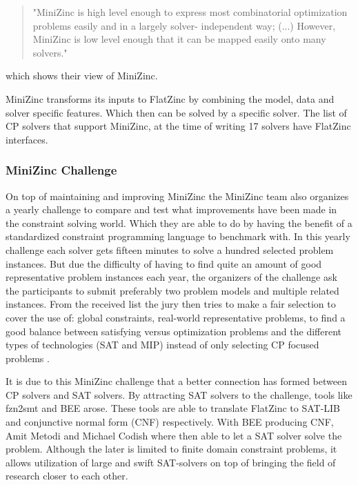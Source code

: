 \begin{quote}
	"MiniZinc is high level enough to express most combinatorial optimization problems easily and in a largely solver-
	independent way; (...) However, MiniZinc is low level enough that it can be mapped easily onto many solvers." \cite{58stuckey2014minizinc}
\end{quote} which shows their view of MiniZinc.

MiniZinc transforms its inputs to FlatZinc by combining the model, data and solver specific features. Which then can be solved by a specific solver. The list of CP solvers that support MiniZinc, at the time of writing 17 solvers have FlatZinc interfaces.

\subsubsection{MiniZinc Challenge}
On top of maintaining and improving MiniZinc the MiniZinc team also organizes a yearly challenge to compare and test what improvements have been made in the constraint solving world. Which they are able to do by having the benefit of a standardized constraint programming language to benchmark with. 
In this yearly challenge each solver gets fifteen minutes to solve a hundred selected problem instances. But due the difficulty of having to find quite an amount of good representative problem instances each year, the organizers of the challenge ask the participants to submit preferably two problem models and multiple related instances. From the received list the jury then tries to make a fair selection to cover the use of: global constraints, real-world representative problems, to find a good balance between satisfying versus optimization problems and the different types of technologies (SAT and MIP) instead of only selecting CP focused problems \cite{58stuckey2014minizinc}.

It is due to this MiniZinc challenge that a better connection has formed between CP solvers and SAT solvers. By attracting SAT solvers to the challenge, tools like fzn2smt \cite{72bofill2010system} and BEE \cite{69BEEmetodi2012compiling} arose. These tools are able to translate FlatZinc to SAT-LIB and conjunctive normal form (CNF) respectively. 
With BEE producing CNF, Amit Metodi and Michael Codish where then able to let a SAT solver solve the problem. Although the later is limited to finite domain constraint problems, it allows utilization of large and swift SAT-solvers on top of bringing the field of research closer to each other.

